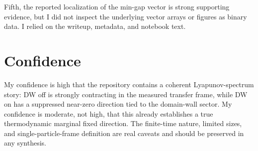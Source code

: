 \documentclass[aps,prb,onecolumn,nofootinbib,superscriptaddress]{revtex4-2}
\begin{document}
Fifth, the reported localization of the min-gap vector is strong supporting
evidence, but I did not inspect the underlying vector arrays or figures as
binary data.  I relied on the writeup, metadata, and notebook text.

\section{Confidence}

My confidence is high that the repository contains a coherent Lyapunov-spectrum
story: DW off is strongly contracting in the measured transfer frame, while DW
on has a suppressed near-zero direction tied to the domain-wall sector.  My
confidence is moderate, not high, that this already establishes a true
thermodynamic marginal fixed direction.  The finite-time nature, limited sizes,
and single-particle-frame definition are real caveats and should be preserved in
any synthesis.
\end{document}
